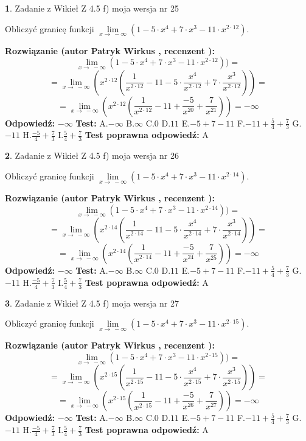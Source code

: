 \documentclass[12pt, a4paper]{article}
\theoremstyle{definition} %
\newtheorem{zad}{}
\newcommand{\zadStart}[1]{\begin{zad}#1\newline}
\newcommand{\zadStop}{\end{zad}}
\newcommand{\rozwStart}[2]{\noindent \textbf{Rozwiązanie (autor #1 , recenzent #2): }\newline}
\newcommand{\rozwStop}{\newline}
\newcommand{\odpStart}{\noindent \textbf{Odpowiedź:}\newline}
\newcommand{\odpStop}{\newline}
\newcommand{\testStart}{\noindent \textbf{Test:}\newline}
\newcommand{\testStop}{\newline}
\newcommand{\kluczStart}{\noindent \textbf{Test poprawna odpowiedź:}\newline}
\newcommand{\kluczStop}{\newline}
\begin{document}
\zadStart{Zadanie z Wikieł Z 4.5 f) moja wersja nr 25}



Obliczyć granicę funkcji  $\lim\limits_{x\to\ -\infty}(1 - 5 \cdot x^{4}+7 \cdot x^{3}- 11 \cdot x^{2\cdot12})$.
\zadStop
\rozwStart{Patryk Wirkus}{}
$$\lim\limits_{x\to\ -\infty}(1 - 5 \cdot x^{4}+7 \cdot x^{3}- 11 \cdot x^{2\cdot12}))=$$
$$=\lim\limits_{x\to\ -\infty}(x^{2\cdot12}(\frac{1}{x^{2\cdot12}}-11 -5 \cdot \frac{x^{4}}{x^{2\cdot12}}+7 \cdot \frac{x^{3}}{x^{2\cdot12}}))=$$
$$=\lim\limits_{x\to\ -\infty}(x^{2\cdot12}(\frac{1}{x^{2\cdot12}}-11 + \frac{-5}{x^{20}}+ \frac{7}{x^{21}}))=-\infty$$
\rozwStop
\odpStart
$-\infty$
\odpStop
\testStart
A.$-\infty$ B.$\infty$ C.$0$ D.$11$ E.$-5 + 7 - 11$
F.$-11+\frac{5}{4}+\frac{7}{3}$ G.$-11$
H.$\frac{-5}{4}+\frac{7}{3}$
I.$\frac{5}{4}+\frac{7}{3}$
\testStop
\kluczStart
A
\kluczStop



\zadStart{Zadanie z Wikieł Z 4.5 f) moja wersja nr 26}



Obliczyć granicę funkcji  $\lim\limits_{x\to\ -\infty}(1 - 5 \cdot x^{4}+7 \cdot x^{3}- 11 \cdot x^{2\cdot14})$.
\zadStop
\rozwStart{Patryk Wirkus}{}
$$\lim\limits_{x\to\ -\infty}(1 - 5 \cdot x^{4}+7 \cdot x^{3}- 11 \cdot x^{2\cdot14}))=$$
$$=\lim\limits_{x\to\ -\infty}(x^{2\cdot14}(\frac{1}{x^{2\cdot14}}-11 -5 \cdot \frac{x^{4}}{x^{2\cdot14}}+7 \cdot \frac{x^{3}}{x^{2\cdot14}}))=$$
$$=\lim\limits_{x\to\ -\infty}(x^{2\cdot14}(\frac{1}{x^{2\cdot14}}-11 + \frac{-5}{x^{24}}+ \frac{7}{x^{25}}))=-\infty$$
\rozwStop
\odpStart
$-\infty$
\odpStop
\testStart
A.$-\infty$ B.$\infty$ C.$0$ D.$11$ E.$-5 + 7 - 11$
F.$-11+\frac{5}{4}+\frac{7}{3}$ G.$-11$
H.$\frac{-5}{4}+\frac{7}{3}$
I.$\frac{5}{4}+\frac{7}{3}$
\testStop
\kluczStart
A
\kluczStop



\zadStart{Zadanie z Wikieł Z 4.5 f) moja wersja nr 27}



Obliczyć granicę funkcji  $\lim\limits_{x\to\ -\infty}(1 - 5 \cdot x^{4}+7 \cdot x^{3}- 11 \cdot x^{2\cdot15})$.
\zadStop
\rozwStart{Patryk Wirkus}{}
$$\lim\limits_{x\to\ -\infty}(1 - 5 \cdot x^{4}+7 \cdot x^{3}- 11 \cdot x^{2\cdot15}))=$$
$$=\lim\limits_{x\to\ -\infty}(x^{2\cdot15}(\frac{1}{x^{2\cdot15}}-11 -5 \cdot \frac{x^{4}}{x^{2\cdot15}}+7 \cdot \frac{x^{3}}{x^{2\cdot15}}))=$$
$$=\lim\limits_{x\to\ -\infty}(x^{2\cdot15}(\frac{1}{x^{2\cdot15}}-11 + \frac{-5}{x^{26}}+ \frac{7}{x^{27}}))=-\infty$$
\rozwStop
\odpStart
$-\infty$
\odpStop
\testStart
A.$-\infty$ B.$\infty$ C.$0$ D.$11$ E.$-5 + 7 - 11$
F.$-11+\frac{5}{4}+\frac{7}{3}$ G.$-11$
H.$\frac{-5}{4}+\frac{7}{3}$
I.$\frac{5}{4}+\frac{7}{3}$
\testStop
\kluczStart
A
\kluczStop
\end{document}
